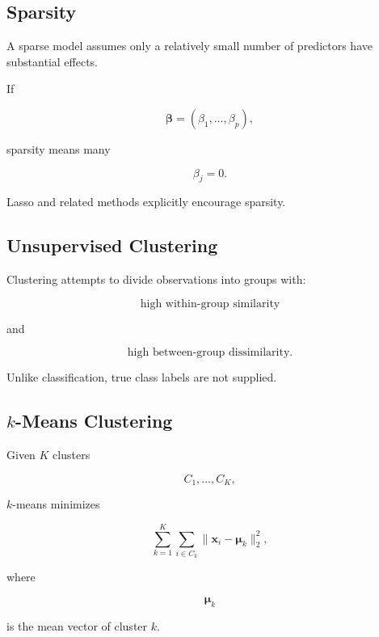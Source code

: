 \subsection{Sparsity}
\label{subsec:sparsity}

A sparse model assumes only a relatively small number of predictors have
substantial effects.

If

\[
\boldsymbol{\beta}
=
(
\beta_1,\ldots,\beta_p
),
\]

sparsity means many

\[
\boxed{
\beta_j=0.
}
\]

Lasso and related methods explicitly encourage sparsity.

\subsection{Unsupervised Clustering}
\label{subsec:unsupervised-clustering}

Clustering attempts to divide observations into groups with:

\[
\boxed{
\text{high within-group similarity}
}
\]

and

\[
\boxed{
\text{high between-group dissimilarity}.
}
\]

Unlike classification, true class labels are not supplied.

\subsection{\(k\)-Means Clustering}
\label{subsec:kmeans-clustering}

Given \(K\) clusters

\[
C_1,\ldots,C_K,
\]

\(k\)-means minimizes

\[
\boxed{
\sum_{k=1}^{K}
\sum_{i\in C_k}
\|
\mathbf{x}_i
-
\boldsymbol{\mu}_k
\|_2^2,
}
\]

where

\[
\boldsymbol{\mu}_k
\]

is the mean vector of cluster \(k\).


